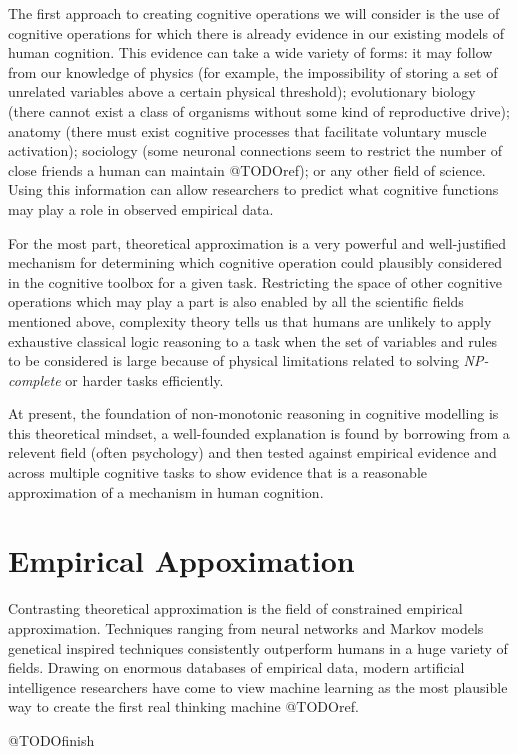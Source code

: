 The first approach to creating cognitive operations we will consider is the use of cognitive operations for which there is already evidence in our existing models of human cognition. This evidence can take a wide variety of forms: it may follow from our knowledge of physics (for example, the impossibility of storing a set of unrelated variables above a certain physical threshold); evolutionary biology (there cannot exist a class of organisms without some kind of reproductive drive); anatomy (there must exist cognitive processes that facilitate voluntary muscle activation); sociology (some neuronal connections seem to restrict the number of close friends a human can maintain @TODOref); or any other field of science. Using this information can allow researchers to predict what cognitive functions may play a role in observed empirical data. 

For the most part, theoretical approximation is a very powerful and well-justified mechanism for determining which cognitive operation could plausibly considered in the cognitive toolbox for a given task. Restricting the space of other cognitive operations which may play a part is also enabled by all the scientific fields mentioned above, complexity theory tells us that humans are unlikely to apply exhaustive classical logic reasoning to a task when the set of variables and rules to be considered is large because of physical limitations related to solving \textit{NP-complete} or harder tasks efficiently.

At present, the foundation of non-monotonic reasoning in cognitive modelling is this theoretical mindset, a well-founded explanation is found by borrowing from a relevent field (often psychology) and then tested against empirical evidence and across multiple cognitive tasks to show evidence that is a reasonable approximation of a mechanism in human cognition.


\section{Empirical Appoximation}
Contrasting theoretical approximation is the field of constrained empirical approximation. Techniques ranging from neural networks and Markov models genetical inspired techniques consistently outperform humans in a huge variety of fields. Drawing on enormous databases of empirical data, modern artificial intelligence researchers have come to view machine learning as the most plausible way to create the first real thinking machine @TODOref.

@TODOfinish
